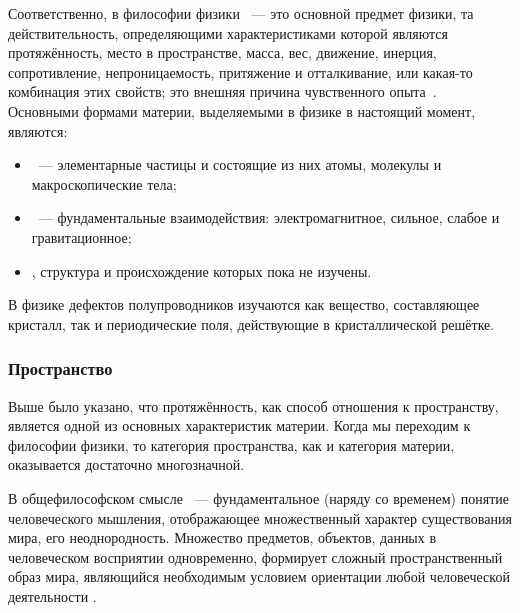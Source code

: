 \documentclass[a4paper, 14pt, titlepage]{extarticle}
\begin{document}
  Соответственно, в философии физики ~--- это основной предмет физики, та
  действительность, определяющими характеристиками которой являются протяжённость, место в
  пространстве, масса, вес, движение, инерция, сопротивление, непроницаемость, притяжение и
  отталкивание, или какая-то комбинация этих свойств; это внешняя причина чувственного
  опыта~\cite{enc-phylosophy-04}. Основными формами материи, выделяемыми в физике в настоящий момент, являются:
  \begin{itemize}
    \item {}~--- элементарные частицы и состоящие из них атомы, молекулы и
      макроскопические тела;
    \item {}~--- фундаментальные взаимодействия: электромагнитное, сильное,
      слабое и гравитационное;
    \item {}, структура и происхождение которых пока не изучены.
  \end{itemize}

  В физике дефектов полупроводников изучаются как вещество, составляющее кристалл, так и
  периодические поля, действующие в кристаллической решётке.

  \subsubsection{Пространство}

  Выше было указано, что протяжённость, как способ отношения к пространству, является одной из
  основных характеристик материи. Когда мы переходим к философии физики, то категория пространства,
  как и категория материи, оказывается достаточно многозначной.

  В общефилософском смысле ~--- фундаментальное (наряду со временем) понятие
  человеческого мышления, отображающее множественный характер существования мира, его
  неоднородность. Множество предметов, объектов, данных в человеческом восприятии одновременно,
  формирует сложный пространственный образ мира, являющийся необходимым условием ориентации любой
  человеческой деятельности \cite{enc-phylosophy-04}.
\end{document}

